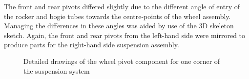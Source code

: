         The front and rear pivots differed slightly due to the different angle of entry of the rocker and bogie tubes towards the centre-points of the wheel assembly. Managing the differences in these angles was aided by use of the 3D skeleton sketch. Again, the front and rear pivots from the left-hand side were mirrored to produce parts for the right-hand side suspension assembly.
       
        \begin{figure}[h!]
        \centering
        \caption[Detailed drawings of the wheel pivot component for one corner of the suspension system]{Detailed drawings of the wheel pivot component for one corner of the suspension system}
        \label{fig:mechDesign-wheelPivotDetail}
        \end{figure}
          
